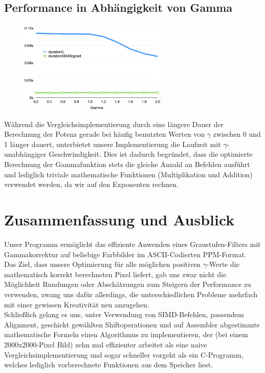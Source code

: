 \documentclass[course=erap]{aspdoc}
\begin{document}
	\subsection{Performance in Abhängigkeit von Gamma}
	\begin{figure}
		\includegraphics[width=7cm]{Images/Gamma.png}
	\end{figure}
	Während die Vergleichsimplementierung durch eine längere Dauer der Berechnung der Potenz gerade bei häufig benutzten Werten von $\gamma$ zwischen 0 und 1 länger dauert, unterbietet unsere Implementierung die Laufzeit mit $\gamma$-unabhängiger Geschwindigkeit.
	Dies ist dadurch begründet, dass die optimierte Berechnung der Gammafunktion stets die gleiche Anzahl an Befehlen ausführt und lediglich triviale mathematische Funktionen (Multiplikation und Addition) verwendet werden, da wir auf den Exponenten rechnen.
	

	
	
	\section{Zusammenfassung und Ausblick}
	Unser Programm ermöglicht das effiziente Anwenden eines Graustufen-Filters mit Gammakorrektur auf beliebige Farbbilder im ASCII-Codierten PPM-Format.\\
	Das Ziel, dass unsere Optimierung für alle möglichen positiven $\gamma$-Werte die mathematisch korrekt berechneten Pixel liefert, gab uns zwar nicht die Möglichkeit Rundungen oder Abschätzungen zum Steigern der Performance zu verwenden, zwang uns dafür allerdings, die unterschiedlichen Probleme mehrfach mit einer gewissen Kreativität neu anzugehen.\\
	Schließlich gelang es uns, unter Verwendung von SIMD-Befehlen, passendem Alignment, geschickt gewählten Shiftoperationen und auf Assembler abgestimmte mathematische Formeln einen Algorithmus zu implementieren, der (bei einem 2000x2000-Pixel Bild) zehn mal effizienter arbeitet als eine naive Vergleichsimplementierung und sogar schneller vorgeht als ein C-Programm, welches lediglich vorberechnete Funktionen aus dem Speicher liest.\\
\end{document}
